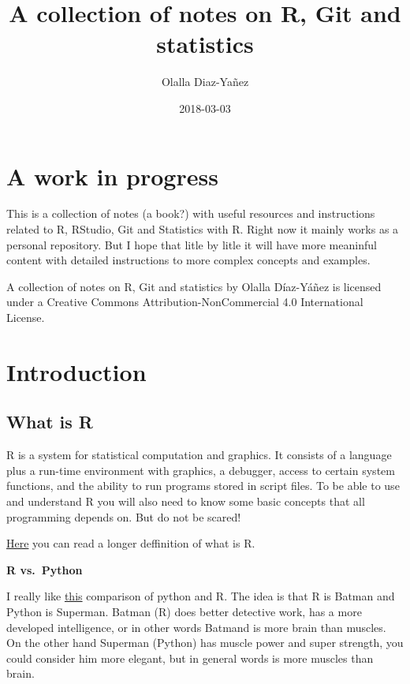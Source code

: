 \documentclass[]{book}
\title{A collection of notes on R, Git and statistics}
\author{Olalla Diaz-Yañez}
\date{2018-03-03}
\theoremstyle{definition}
\theoremstyle{definition}
\theoremstyle{definition}
\theoremstyle{remark}
\begin{document}
\maketitle

{
\setcounter{tocdepth}{1}
\tableofcontents
}
\hypertarget{a-work-in-progress}{%
\chapter{A work in progress}\label{a-work-in-progress}}

This is a collection of notes (a book?) with useful resources and
instructions related to R, RStudio, Git and Statistics with R. Right now
it mainly works as a personal repository. But I hope that litle by litle
it will have more meaninful content with detailed instructions to more
complex concepts and examples.

{A collection of notes on R, Git and statistics} by Olalla Díaz-Yáñez is
licensed under a Creative Commons Attribution-NonCommercial 4.0
International License.

\hypertarget{intro}{%
\chapter{Introduction}\label{intro}}

\hypertarget{what-is-r}{%
\section{What is R}\label{what-is-r}}

R is a system for statistical computation and graphics. It consists of a
language plus a run-time environment with graphics, a debugger, access
to certain system functions, and the ability to run programs stored in
script files. To be able to use and understand R you will also need to
know some basic concepts that all programming depends on. But do not be
scared!

\href{https://cran.r-project.org/doc/FAQ/R-FAQ.html\#What-is-R_003f}{Here}
you can read a longer deffinition of what is R.

\textbf{R vs.~Python}

I really like
\href{http://ucanalytics.com/blogs/r-vs-python-comparison-and-awsome-books-free-pdfs-to-learn-them/}{this}
comparison of python and R. The idea is that R is Batman and Python is
Superman. Batman (R) does better detective work, has a more developed
intelligence, or in other words Batmand is more brain than muscles. On
the other hand Superman (Python) has muscle power and super strength,
you could consider him more elegant, but in general words is more
muscles than brain.
\end{document}
